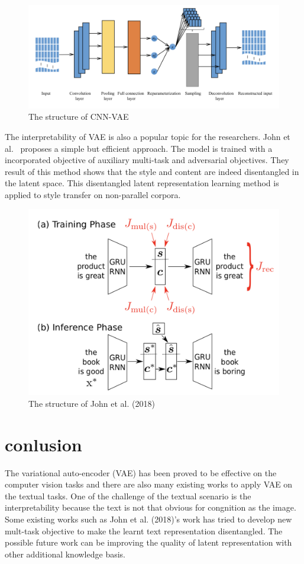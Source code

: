 \documentclass{article}
\begin{document}
\begin{figure}[ht]
  \centering
  \includegraphics[width = 0.75\linewidth]{figures/cnnvae.png}
  \caption{The structure of CNN-VAE}
  \label{fig::CNN-VAE}
\end{figure}

The interpretability of VAE is also a popular topic for the researchers. John et al.~\cite{john2018disentangled} proposes a simple but efficient approach. The model is trained with a incorporated objective of auxiliary multi-task and adversarial objectives. They result of this method shows that the style and content are indeed disentangled in the latent space. This disentangled latent representation learning method is applied to style transfer on non-parallel corpora.

\begin{figure}[ht]
  \centering
  \includegraphics[width = 0.6\linewidth]{figures/john.png}
  \caption{The structure of John et al. (2018)}
  \label{fig::CNN-VAE}
\end{figure}

\section{conlusion}
The variational auto-encoder (VAE) has been proved to be effective on the computer vision tasks and there are also many existing works to apply VAE on the textual tasks. One of the challenge of the textual scenario is the interpretability because the text is not that obvious for congnition as the image. Some existing works such as John et al. (2018)'s work has tried to develop new mult-task objective to make the learnt text representation disentangled. The possible future work can be improving the quality of latent representation with other additional knowledge basis.



\end{document}
